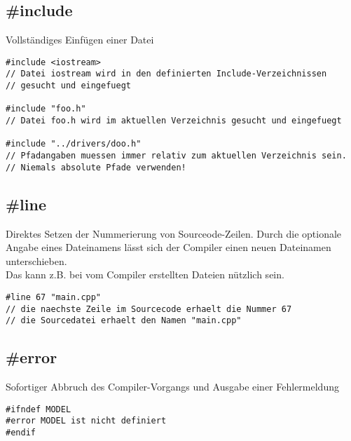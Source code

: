 \subsection{\#include}
Vollständiges Einfügen einer Datei
\begin{minipage}{0.9\linewidth}
\vspace{-\baselineskip}
\begin{lstlisting}
#include <iostream>
// Datei iostream wird in den definierten Include-Verzeichnissen
// gesucht und eingefuegt

#include "foo.h"
// Datei foo.h wird im aktuellen Verzeichnis gesucht und eingefuegt

#include "../drivers/doo.h"
// Pfadangaben muessen immer relativ zum aktuellen Verzeichnis sein.
// Niemals absolute Pfade verwenden!
\end{lstlisting}
\end{minipage}
\vfill
\pagebreak\newpage

\subsection{\#line}
Direktes Setzen der Nummerierung von Sourceode-Zeilen. Durch die optionale Angabe eines Dateinamens lässt sich der Compiler einen neuen Dateinamen unterschieben.\\
Das kann z.B. bei vom Compiler erstellten Dateien nützlich sein.
\begin{minipage}{0.8\linewidth}
\vspace{-\baselineskip}
\begin{lstlisting}
#line 67 "main.cpp"
// die naechste Zeile im Sourcecode erhaelt die Nummer 67
// die Sourcedatei erhaelt den Namen "main.cpp"
\end{lstlisting}
\end{minipage}

\subsection{\#error}
Sofortiger Abbruch des Compiler-Vorgangs und Ausgabe einer Fehlermeldung
\begin{minipage}{0.4\linewidth}
\vspace{-\baselineskip}
\begin{lstlisting}
#ifndef MODEL
#error MODEL ist nicht definiert
#endif
\end{lstlisting}
\end{minipage}

